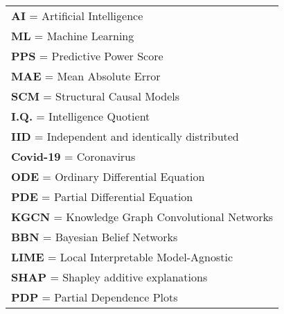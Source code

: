 \newpage
{}

\begin{Listofabbreviations}

\begin{center}
    \begin{tabular}{@{}l@{}}
    \textbf{AI} = Artificial Intelligence \\
    \textbf{ML} = Machine Learning \\
    \textbf{PPS} = Predictive Power Score \\
    \textbf{MAE} = Mean Absolute Error \\
    \textbf{SCM} = Structural Causal Models \\
    \textbf{I.Q.} = Intelligence Quotient \\
    \textbf{IID} = Independent and identically distributed \\
    \textbf{Covid-19} = Coronavirus \\
    \textbf{ODE} = Ordinary Differential Equation \\
    \textbf{PDE} = Partial Differential Equation \\
    \textbf{KGCN} = Knowledge Graph Convolutional Networks \\
    \textbf{BBN} = Bayesian Belief Networks \\
    \textbf{LIME} = Local Interpretable Model-Agnostic \\
    \textbf{SHAP} = Shapley additive explanations \\
    \textbf{PDP} = Partial Dependence Plots \\
    \end{tabular}
\end{center}

\end{Listofabbreviations}